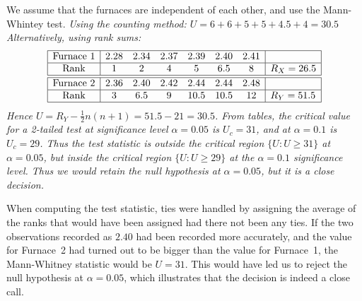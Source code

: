 \begin{exercise}
\begin{questions}
\begin{answer}
We assume that the furnaces are independent of each other, and use the Mann-Whintey test. 
\bit
\it Using the counting method: $U = 6 + 6 + 5 + 5 + 4.5 + 4 = 30.5$
\it Alternatively, using rank sums:
\[\begin{array}{|c|cccccc|l|}\hline
\text{Furnace $1$}	& 2.28	& 2.34	& 2.37	& 2.39	& 2.40	& 2.41	&  				\\ \hline
\text{Rank}			& 1    	& 2    	& 4    	& 5  	& 6.5	& 8  	& R_X = 26.5		\\ \hline\hline
\text{Furnace $2$}	& 2.36	& 2.40	& 2.42	& 2.44	& 2.44	& 2.48	& 				\\ \hline
\text{Rank}			& 3  	& 6.5	& 9		& 10.5	& 10.5 	& 12		& R_Y = 51.5		\\ \hline
\end{array}\]
Hence $U = R_Y - \frac{1}{2} n(n+1) = 51.5 - 21 = 30.5$.
\eit
From tables, the critical value for a 2-tailed test at significance level $\alpha=0.05$ is $U_c=31$, and at $\alpha=0.1$ is $U_c=29$. Thus the test statistic is outside the critical region $\{U:U\geq 31\}$ at $\alpha=0.05$, but inside the critical region $\{U:U\geq 29\}$ at the $\alpha=0.1$ significance level. Thus we would retain the null hypothesis at $\alpha=0.05$, but it is a close decision. 

When computing the test statistic, ties were handled by assigning the average of the ranks that would have been assigned had there not been any ties. If the two observations recorded as $2.40$ had been recorded more accurately, and the value for Furnace~2 had turned out to be bigger than the value for Furnace~1, the Mann-Whitney statistic would be $U=31$. This would have led us to reject the null hypothesis at $\alpha=0.05$, which illustrates that the decision is indeed a close call.
\end{answer}

\end{questions}
\end{exercise}
